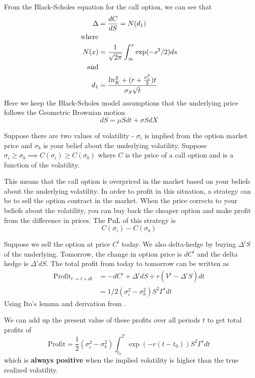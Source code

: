 \documentclass[10pt]{article}
\theoremstyle{definition}
\begin{document}
From the Black-Scholes equation for the call option, we can see that 
\begin{align*}
    \Delta &= \frac{d C}{d S} = N(d_1)\\
    \text{where}\\
    N(x) &= \frac{1}{\sqrt{2\pi}} \int_{\infty}^x \exp(-s^2/2) ds\\
    \text{and}\\
    d_1 &= {{ln^{S}_K+(r+{\sigma^{2}_v \over2} )t} \over \sigma_S \sqrt t}
\end{align*}
Here we keep the Black-Scholes model assumptions that the underlying price follows the Geometric Brownian motion
$$
dS = \mu S dt  + \sigma S dX
$$

Suppose there are two values of volatility - $\sigma_i$ is implied from the option market price and $\sigma_b$ is your belief about the underlying volatility. Suppose $\sigma_i \ge \sigma_b \implies C(\sigma_i) \ge C(\sigma_b)$ where $C$ is the price of a call option and is a function of the volatility.  

This means that the call option is overpriced in the market based on your beliefs about the underlying volatility. In order to profit in this situation, a strategy can be to sell the option contract in the market. When the price corrects to your beliefs about the volatility, you can buy back the cheaper option and make profit from the difference in prices. The PnL of this strategy is 
$$
C(\sigma_i) - C(\sigma_b)
$$

Suppose we sell the option at price $C^i$ today. We also delta-hedge by buying $\Delta^i S$ of the underlying. Tomorrow, the change in option price is $dC^i$ and the delta hedge is $\Delta^i dS$.  The total profit from today to tomorrow can be written as
\begin{align*}
    \text{Profit}_{t \rightarrow t+dt} &= -dC^i + \Delta^i dS + r(V^i - \Delta^iS) dt\\ 
    &= 1/2 (\sigma^2_i - \sigma^2_b) S^2 \Gamma^i dt
\end{align*}
Using Ito's lemma and derivation from \citep{ahmad2005free}.

We can add up the present value of these profits over all periods $t$ to get total profits of 
$$
\text{Profit} = \frac12 (\sigma^2_i - \sigma^2_b) \int_{t_0}^T \exp(-r(t-t_0))S^2\Gamma^idt
$$
which is \textbf{always positive} when the implied volatility is higher than the true realized volatility.
\end{document}
